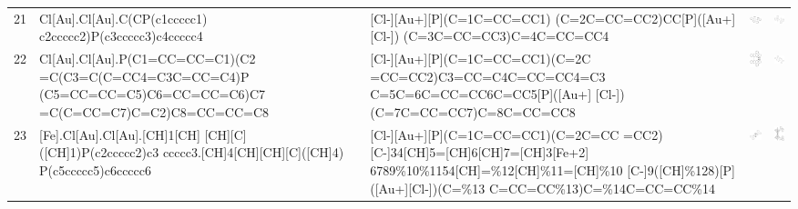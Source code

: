 \begin{landscape}
\begin{longtable}{m{0.3cm}m{6.7cm}m{7.7cm}m{2.3cm}m{2.3cm}}
 21 &
 Cl[Au].Cl[Au].C(CP(c1ccccc1) c2ccccc2)P(c3ccccc3)c4ccccc4 & 
 [Cl-][Au+][P](C=1C=CC=CC1) (C=2C=CC=CC2)CC[P]([Au+][Cl-]) (C=3C=CC=CC3)C=4C=CC=CC4 & 
 \includegraphics[width=2.2cm]{imagenes/sigmaAldrich/Dichloro(DPPE)digold(I).jpeg} & 
 \includegraphics[width=2.2cm]{imagenes/sciFinder/pdf/Dichloro(DPPE)digold(I).pdf} \\


 22 &
 Cl[Au].Cl[Au].P(C1=CC=CC=C1)(C2 =C(C3=C(C=CC4=C3C=CC=C4)P (C5=CC=CC=C5)C6=CC=CC=C6)C7 =C(C=CC=C7)C=C2)C8=CC=CC=C8 & 
 [Cl-][Au+][P](C=1C=CC=CC1)(C=2C =CC=CC2)C3=CC=C4C=CC=CC4=C3 C=5C=6C=CC=CC6C=CC5[P]([Au+] [Cl-])(C=7C=CC=CC7)C=8C=CC=CC8 & 
 \includegraphics[width=2.2cm]{imagenes/sigmaAldrich/Dichloro[(±)−BINAP]digold(I).png} & 
 \includegraphics[width=2.2cm]{imagenes/sciFinder/pdf/Dichloro[(±)−BINAP]digold(I).pdf} \\


 23 &
 [Fe].Cl[Au].Cl[Au].[CH]1[CH] [CH][C]([CH]1)P(c2ccccc2)c3 ccccc3.[CH]4[CH][CH][C]([CH]4) P(c5ccccc5)c6ccccc6 & 
 [Cl-][Au+][P](C=1C=CC=CC1)(C=2C=CC =CC2)[C-]34[CH]5=[CH]6[CH]7=[CH]3[Fe+2] 6789\%10\%1154[CH]=\%12[CH]\%11=[CH]\%10 [C-]9([CH]\%128)[P]([Au+][Cl-])(C=\%13 C=CC=CC\%13)C=\%14C=CC=CC\%14 & 
 \includegraphics[width=2.5cm]{imagenes/sigmaAldrich/pdf/Bis(chlorogold(I)) [1,1-bis(diphenylphosphino)ferrocene.png} & 
 \includegraphics[width=2.2cm]{imagenes/sciFinder/pdf/Bis(chlorogold(I)) [1,1-bis(diphenylphosphino)ferrocene].pdf} \\



\end{longtable}
\end{landscape}
